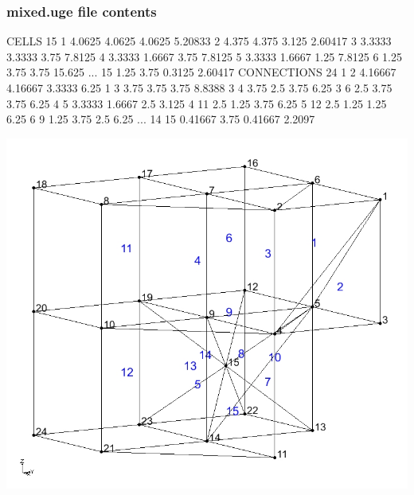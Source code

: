 \documentclass{beamer}
\begin{document}
\begin{frame}\frametitle{mixed.uge file contents}

\begin{minipage}[t]{0.48\linewidth}
  \small
  \begin{semiverbatim}
CELLS 15
1 4.0625 4.0625 4.0625 5.20833
2 4.375 4.375 3.125 2.60417
3 3.3333 3.3333 3.75 7.8125
4 3.3333 1.6667 3.75 7.8125
5 3.3333 1.6667 1.25 7.8125
6 1.25 3.75 3.75 15.625
...
15 1.25 3.75 0.3125 2.60417
CONNECTIONS 24
1 2 4.16667 4.16667 3.3333 6.25
1 3 3.75 3.75 3.75 8.8388
3 4 3.75 2.5 3.75 6.25
3 6 2.5 3.75 3.75 6.25
4 5 3.3333 1.6667 2.5 3.125
4 11 2.5 1.25 3.75 6.25
5 12 2.5 1.25 1.25 6.25
6 9 1.25 3.75 2.5 6.25
...
14 15 0.41667 3.75 0.41667 2.2097
  \end{semiverbatim}
\end{minipage}
\hfill
\begin{minipage}[t]{0.48\linewidth}
  \vspace{0.1in}
  \hspace{.0in}
  \includegraphics[width=1.2\linewidth]{./mixed}
\end{minipage}

\end{frame}
\end{document}
